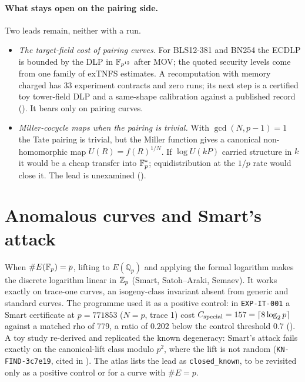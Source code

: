 \paragraph{What stays open on the pairing side.} Two leads remain, neither
with a run.
\begin{itemize}
\item \emph{The target-field cost of pairing curves.} For BLS12-381 and
  BN254 the ECDLP is bounded by the DLP in $\mathbb{F}_{p^{12}}$ after MOV; the
  quoted security levels come from one family of exTNFS estimates. A
  recomputation with memory charged has 33 experiment contracts and zero
  runs; its next step is a certified toy tower-field DLP and a same-shape
  calibration against a published record
  ().
  It bears only on pairing curves.
\item \emph{Miller-cocycle maps when the pairing is trivial.} With
  $\gcd(N,p-1)=1$ the Tate pairing is trivial, but the Miller function
  gives a canonical non-homomorphic map $U(R)=f(R)^{1/N}$. If $\log U(kP)$
  carried structure in $k$ it would be a cheap transfer into $\mathbb{F}_p^*$;
  equidistribution at the $1/p$ rate would close it. The lead is
  unexamined
  ().
\end{itemize}

\section{Anomalous curves and Smart's attack}\label{sec:tp-smart}

When $\#E(\mathbb{F}_p)=p$, lifting to $E(\mathbb{Q}_p)$ and applying the formal
logarithm makes the discrete logarithm linear in $\mathbb{Z}_p$ (Smart,
Satoh--Araki, Semaev). It works exactly on trace-one curves, an
isogeny-class invariant absent from generic and standard curves. The
programme used it as a positive control: in \texttt{EXP-IT-001} a Smart
certificate at $p=771853$ ($N=p$, trace 1) cost $C_{\rm special}=157=\lceil8\log_2p\rceil$
against a matched rho of 779, a ratio of $0.202$ below the control
threshold $0.7$ ().
A toy study re-derived and replicated the known degeneracy: Smart's attack
fails exactly on the canonical-lift class modulo $p^2$, where the lift is
not random (\texttt{KN-FIND-3c7e19}, cited in
).
The atlas lists the lead as \texttt{closed\_known}, to be revisited only as
a positive control or for a curve with $\#E=p$.

